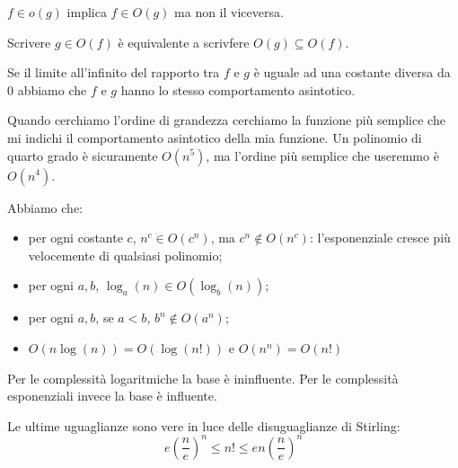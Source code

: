 $f \in o(g)$ implica $f \in O(g)$ ma non il viceversa.

Scrivere $g \in O(f)$ è equivalente a scrivfere $O(g) \subseteq O(f)$.

Se il limite all'infinito del rapporto tra $f$ e $g$ è uguale ad una costante diversa da 0 abbiamo che
$f$ e $g$ hanno lo stesso comportamento asintotico.

Quando cerchiamo l'ordine di grandezza cerchiamo la funzione più semplice che mi indichi il
comportamento asintotico della mia funzione. Un polinomio di quarto grado è sicuramente $O(n^{5})$,
ma l'ordine più semplice che useremmo è $O(n^{4})$.

Abbiamo che:
\begin{itemize}
    \item per ogni costante $c$, $n^{c} \in O(c^{n})$, ma $c^{n} \notin O(n^{c})$: l'esponenziale
    cresce più velocemente di qualsiasi polinomio;
    \item per ogni $a,b$, $\log_{a}(n) \in O(\log_{b}(n))$;
    \item per ogni $a,b$, se $a < b$, $b^{n} \notin O(a^{n})$;
    \item $O(n \log(n)) = O(\log(n!))$ e $O(n^{n}) = O(n!)$ 
\end{itemize}

Per le complessità logaritmiche la base è ininfluente. Per le complessità esponenziali invece la
base è influente.

Le ultime uguaglianze sono vere in luce delle disuguaglianze di Stirling:
\begin{equation*}
    e\left(\frac{n}{e}\right)^{n} \leq n! \leq e n \left(\frac{n}{e}\right)^{n}
\end{equation*}

